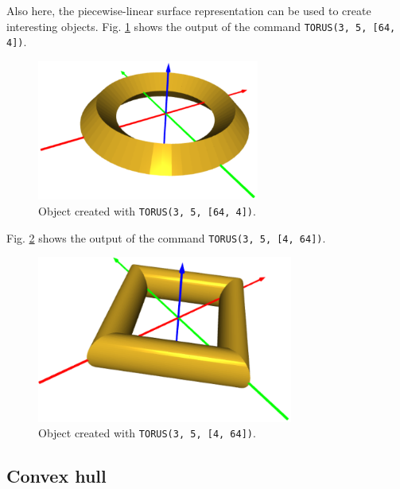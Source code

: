 \noindent
Also here, the piecewise-linear surface representation can be used to
create interesting objects.   
Fig. \ref{fig:torus-4} shows the output of the command {\tt TORUS(3, 5, [64, 4])}.

\begin{figure}[!ht]
\begin{center}
\includegraphics[width=0.65\textwidth]{img/torus-4.png}
\end{center}
\vspace{-4mm}
\caption{Object created with {\tt TORUS(3, 5, [64, 4])}.}
\label{fig:torus-4}
\end{figure}
\noindent
Fig. \ref{fig:torus-5} shows the output of the command {\tt TORUS(3, 5, [4, 64])}.\\

\begin{figure}[!ht]
\begin{center}
\includegraphics[width=0.75\textwidth]{img/torus-5.png}
\end{center}
\vspace{-4mm}
\caption{Object created with {\tt TORUS(3, 5, [4, 64])}.}
\label{fig:torus-5}
\end{figure}
\noindent

\subsection{Convex hull}

